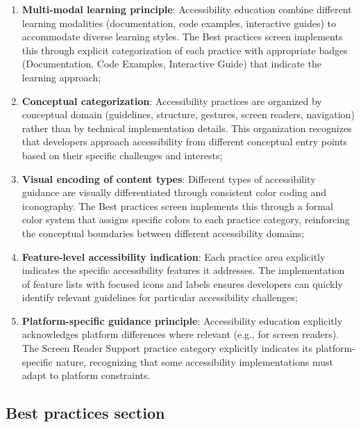 \begin{enumerate}
    \item \textbf{Multi-modal learning principle}: Accessibility education combine different learning modalities (documentation, code examples, interactive guides) to accommodate diverse learning styles. The Best practices screen implements this through explicit categorization of each practice with appropriate badges (Documentation, Code Examples, Interactive Guide) that indicate the learning approach;
    
    \item \textbf{Conceptual categorization}: Accessibility practices are organized by conceptual domain (guidelines, structure, gestures, screen readers, navigation) rather than by technical implementation details. This organization recognizes that developers approach accessibility from different conceptual entry points based on their specific challenges and interests;
    
    \item \textbf{Visual encoding of content types}: Different types of accessibility guidance are visually differentiated through consistent color coding and iconography. The Best practices screen implements this through a formal color system that assigns specific colors to each practice category, reinforcing the conceptual boundaries between different accessibility domains;
    
    \item \textbf{Feature-level accessibility indication}: Each practice area explicitly indicates the specific accessibility features it addresses. The implementation of feature lists with focused icons and labels ensures developers can quickly identify relevant guidelines for particular accessibility challenges;
    
    \item \textbf{Platform-specific guidance principle}: Accessibility education explicitly acknowledges platform differences where relevant (e.g., for screen readers). The Screen Reader Support practice category explicitly indicates its platform-specific nature, recognizing that some accessibility implementations must adapt to platform constraints.
\end{enumerate}

\subsection{Best practices section}
\label{subsec:best-practices-section}

